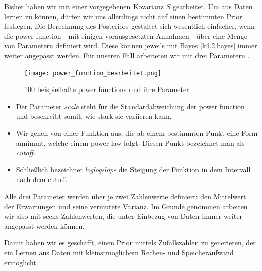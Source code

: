 \documentclass[]{dsadokumentation}
\begin{document}
Bisher haben wir mit einer vorgegebenen Kovarianz $S$ gearbeitet. Um aus Daten lernen zu können, dürfen wir uns allerdings nicht auf einen bestimmten Prior festlegen. Die Berechnung des Posteriors gestaltet sich wesentlich einfacher, wenn die power function - mit einigen vorausgesetzten Annahmen - über eine Menge von Parametern definiert wird. Diese können jeweils mit Bayes \cref{k4.2.bayes} immer weiter angepasst werden. Für unseren Fall arbeiteten wir mit drei Parametern %
.
\begin{figure}[h] 
    \centering
    \texttt{[image: power\_function\_bearbeitet.png]}
    \caption{100 beispielhafte power functions und ihre Parameter}
\end{figure}
\begin{itemize}
    \item Der Parameter \emph{scale} steht für die Standardabweichung der power function und beschreibt somit, wie stark sie variieren kann.
    \item Wir gehen von einer Funktion aus, die ab einem bestimmten Punkt eine Form annimmt, welche einem power-law folgt. Diesen Punkt bezeichnet man als \emph{cutoff}.
    \item Schließlich bezeichnet \emph{loglogslope} die Steigung der Funktion in dem Intervall nach dem cutoff.
\end{itemize}
Alle drei Parameter werden über je zwei Zahlenwerte definiert: den Mittelwert der Erwartungen und seine vermutete Varianz. Im Grunde genommen arbeiten wir also mit sechs Zahlenwerten, die unter Einbezug von Daten immer weiter angepasst werden können.

Damit haben wir es geschafft, einen Prior mittels Zufallszahlen zu generieren, der ein Lernen aus Daten mit kleinstmöglichem Rechen- und Speicheraufwand ermöglicht.


\printbibliography{}
\end{document}
